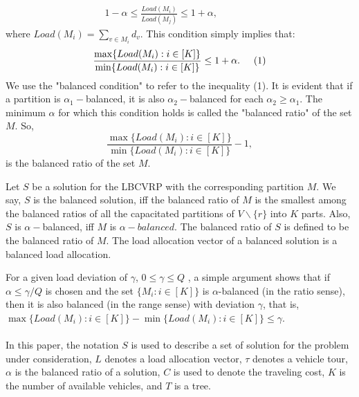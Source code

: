 $$\begin{array}{*{20}{c}}
{1 - \alpha  \le \frac{Load({M_i})}{Load({M_j})} \le 1 + \alpha ,\,\,\,\,\,\,\,\,\,\,\,\,\,\,\,\,\,\,\,\,\,\,\,}
\end{array}$$
\noindent where $Load({M_i}) = \sum\nolimits_{v \in {M_i}} {{d_v}}$. This condition simply implies that: 
$$\frac{\max \{ Load(M_i):i \in [K]\}}{\min \{ Load(M_i):i \in [K]\}}  \le 1 + \alpha. \hspace{0.5 cm} (1)$$
\indent We use the "balanced condition" to refer to the inequality (1). It is evident that if a partition is $\alpha_1-$balanced, it is also ${\alpha _2}-$balanced for each ${\alpha _2} \ge {\alpha _1}$. The minimum $\alpha$ for which this condition holds is called the "balanced ratio" of the set $M$. So, 
$$\frac{\max \{ Load(M_i):i \in [K]\}}{\min \{ Load(M_i):i \in [K]\}}-1,$$ 
\noindent is the balanced ratio of the set $M$. 
\begin{definition}Let $S$ be a solution for the LBCVRP with the corresponding partition $M$. We say, $S$ is the balanced solution, iff the balanced ratio of $M$ is the smallest among the balanced ratios of all the capacitated partitions of $V\backslash \{r\}$ into $K$ parts. Also, $S$ is $\alpha-$balanced, iff $M$ is $\alpha-balanced$. The balanced ratio of $S$ is defined to be the balanced ratio of $M$. The load allocation vector of a balanced solution is a balanced load allocation. 
\end{definition}

 \indent For a given load deviation of $\gamma$, $0 \le \gamma  \le Q$ , a simple argument shows that if $\alpha  \le \gamma /Q$  is chosen and the set  $\{ {M_i}:i \in [K]\} $ is $\alpha$-balanced (in the ratio sense), then it is also balanced (in the range sense) with deviation $\gamma$, that is, $\max \{ Load(M_i):i \in [K]\}-{\min \{ Load(M_i):i \in [K]\}} \le \gamma$. \\
 \\
 \indent In this paper, the notation $S$ is used to describe a set of solution for the problem under consideration, $L$ denotes a load allocation vector, $\tau$ denotes a vehicle tour, $\alpha$ is the balanced ratio of a solution, $C$ is used to denote the traveling cost, $K$ is the number of available vehicles, and $T$ is a tree.
